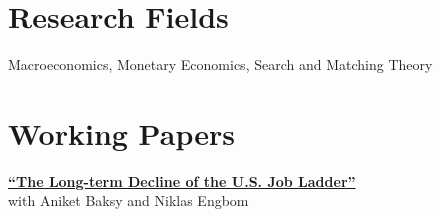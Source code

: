 \documentclass[margin,line]{res}                          %
\newenvironment{list1}{
	\begin{list}{\ding{113}}{%
			\setlength{\itemsep}{0in}
			\setlength{\parsep}{0in} \setlength{\parskip}{0in}
			\setlength{\topsep}{0in} \setlength{\partopsep}{0in}
			\setlength{\leftmargin}{0.17in}}}{\end{list}}
\begin{document}
\begin{resume}
		
		\section{\sc Research Fields}%
	\begin{list1}
		\item[] Macroeconomics, Monetary Economics, Search and Matching Theory
	\end{list1}
	
	\section{\sc Working Papers}
	\begin{list1}
		\item[] \href{https://danicaratelli.github.io/research/papers/The_Long_term_Decline_of_the_US_Job_Ladder.pdf}{\textbf{{\color{darkblue}``The Long-term Decline of the U.S. Job Ladder''}}}\\ 
		with Aniket Baksy and Niklas Engbom\smallskip
		
		\vspace{7pt}
		

\end{list1}
\end{resume}
\end{document}
